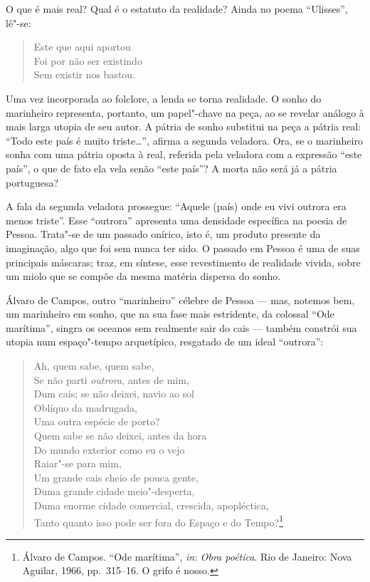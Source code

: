 O que é mais real? Qual é o estatuto da realidade?
Ainda no poema “Ulisses”, lê"-se: 
\begin{hedraquote}
\begin{verse}
Este que aqui aportou\\
Foi por não ser existindo\\ 
Sem existir nos bastou.
\end{verse}
\end{hedraquote}
Uma vez incorporada ao
folclore, a lenda se torna realidade. 
O sonho do marinheiro representa,
portanto, um papel"-chave na peça, ao se revelar 
análogo à mais larga
utopia de seu autor. A pátria de sonho 
substitui na peça a pátria real: “Todo este
país é muito triste\ldots{}”, afirma a segunda veladora. Ora, se
o marinheiro sonha com uma pátria oposta à
real, referida pela veladora
com a expressão “este país”, o que de
fato ela vela senão “este país”?
A morta não será já a pátria portuguesa? 

A fala da segunda veladora prossegue: “Aquele (país) onde eu vivi
outrora era menos triste”. Esse “outrora” apresenta uma densidade
específica na poesia de Pessoa.
Trata"-se de um passado onírico, isto é,
um produto presente da imaginação, algo que foi sem nunca ter
sido. O passado em Pessoa é uma de suas principais
máscaras; traz, em síntese, esse revestimento de realidade vivida,
sobre um miolo que se compõe da mesma matéria dispersa do sonho. 


Álvaro de Campos, outro “marinheiro” célebre
de Pessoa --- mas, notemos
bem, um marinheiro em sonho, que na sua fase mais estridente, da
colossal “Ode marítima”, singra os oceanos sem
realmente sair do cais ---
também constrói sua utopia num espaço"-tempo 
arquetípico, resgatado de
um ideal “outrora”:

\begin{hedraquote}
\begin{verse}
Ah, quem sabe, quem sabe,\\
Se não parti \textit{outrora}, antes de mim,\\
Dum cais; se não deixei, navio ao sol\\
Oblíquo da madrugada,\\
Uma outra espécie de porto?\\
Quem sabe se não deixei, antes da hora\\
Do mundo exterior como eu o vejo\\
Raiar"-se para mim,\\
Um grande cais cheio de pouca gente,\\
Duma grande cidade meio"-desperta,\\
Duma enorme cidade comercial, crescida, \qb apopléctica,\\
Tanto quanto isso pode ser fora do Espaço e \qb do Tempo?\footnote{ 
Álvaro de Campos. “Ode marítima”, \textit{in}:
 \textit{Obra poética}. Rio de Janeiro:
Nova Aguilar,
1966, pp.~315--16. O grifo é nosso.}
\end{verse}
\end{hedraquote}

